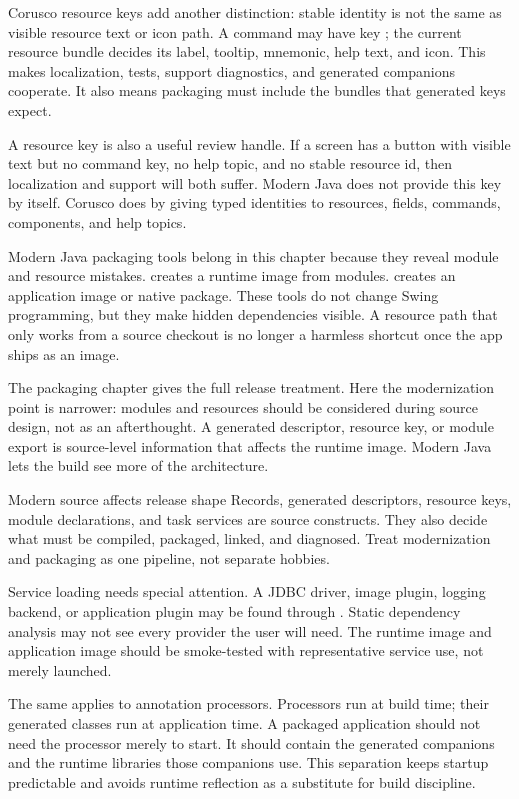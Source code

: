 Corusco resource keys add another distinction: stable identity is not the same as visible resource text or icon path. A command may have key ; the current resource bundle decides its label, tooltip, mnemonic, help text, and icon. This makes localization, tests, support diagnostics, and generated companions cooperate. It also means packaging must include the bundles that generated keys expect.

A resource key is also a useful review handle. If a screen has a button with visible text but no command key, no help topic, and no stable resource id, then localization and support will both suffer. Modern Java does not provide this key by itself. Corusco does by giving typed identities to resources, fields, commands, components, and help topics.

Modern Java packaging tools belong in this chapter because they reveal module and resource mistakes.  creates a runtime image from modules.  creates an application image or native package. These tools do not change Swing programming, but they make hidden dependencies visible. A resource path that only works from a source checkout is no longer a harmless shortcut once the app ships as an image.

The packaging chapter gives the full release treatment. Here the modernization point is narrower: modules and resources should be considered during source design, not as an afterthought. A generated descriptor, resource key, or module export is source-level information that affects the runtime image. Modern Java lets the build see more of the architecture.

\begin{detailbox}{Modern source affects release shape}
Records, generated descriptors, resource keys, module declarations, and task services are source constructs. They also decide what must be compiled, packaged, linked, and diagnosed. Treat modernization and packaging as one pipeline, not separate hobbies.
\end{detailbox}

Service loading needs special attention. A JDBC driver, image plugin, logging backend, or application plugin may be found through . Static dependency analysis may not see every provider the user will need. The runtime image and application image should be smoke-tested with representative service use, not merely launched.

The same applies to annotation processors. Processors run at build time; their generated classes run at application time. A packaged application should not need the processor merely to start. It should contain the generated companions and the runtime libraries those companions use. This separation keeps startup predictable and avoids runtime reflection as a substitute for build discipline.

